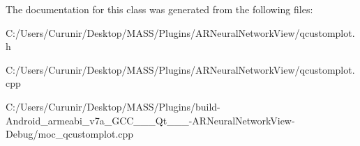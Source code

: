 The documentation for this class was generated from the following files\+:\begin{DoxyCompactItemize}
\item 
C\+:/\+Users/\+Curunir/\+Desktop/\+M\+A\+S\+S/\+Plugins/\+A\+R\+Neural\+Network\+View/qcustomplot.\+h\item 
C\+:/\+Users/\+Curunir/\+Desktop/\+M\+A\+S\+S/\+Plugins/\+A\+R\+Neural\+Network\+View/qcustomplot.\+cpp\item 
C\+:/\+Users/\+Curunir/\+Desktop/\+M\+A\+S\+S/\+Plugins/build-\/\+Android\+\_\+armeabi\+\_\+v7a\+\_\+\+G\+C\+C\+\_\+\_\+\_\+\+Qt\+\_\+\_\+\_-\/\+A\+R\+Neural\+Network\+View-\/\+Debug/moc\+\_\+qcustomplot.\+cpp\end{DoxyCompactItemize}
